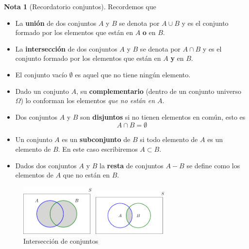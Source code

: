 \documentclass[]{book}
\theoremstyle{plain}
\theoremstyle{definition}
\newtheorem{note}[theorem]{Nota}
\begin{document}
\begin{note}[Recordatorio conjuntos]
  Recordemos que 
  \begin{itemize}
    \item La \textbf{unión} de dos conjuntos $A$ y $B$ se denota por $A\cup B$ y es el conjunto formado por los 
    elementos que están en $A$ \textbf{o} en $B$.
    \item La \textbf{intersección} de dos conjuntos $A$ y $B$ se denota por $A\cap B$ y es el conjunto formado por los 
    elementos que están en $A$ \textbf{y} en $B$.
    \item El conjunto vacío $\emptyset$ es aquel que no tiene ningún elemento.
    \item Dado un conjunto $A$, su \textbf{complementario} (dentro de un conjunto universo $\Omega$) lo conforman los elementos 
    \emph{que no están en $A$}.
    \item Dos conjuntos $A$ y $B$ son \textbf{disjuntos} si no tienen elementos en común, esto es 
    \[
    A \cap B = \emptyset  
    \]

    \item Un conjunto $A$ es un \textbf{subconjunto} de $B$ si todo elemento de $A$ es un elemento de $B$. En este caso escribiremos
    $A\subset B$.
    
    \item Dados dos conjuntos $A$ y $B$ la \textbf{resta} de conjuntos $A-B$ se define como los elementos de $A$ que no están en $B$.
    \end{itemize}

    \begin{figure}[htbp]
      \begin{minipage}{0.5\linewidth}
      \centering
      \includegraphics[width=1.5in,height=\textheight]{img/union_b.png}
      \caption{Unión de conjuntos}
      \end{minipage}%
      \begin{minipage}{0.5\linewidth}
      \centering
      \includegraphics[width=1.5in,height=\textheight]{img/intersection_b.png}
      \caption{Intersección de conjuntos}
      \end{minipage}


\end{figure}
\end{note}
\end{document}
